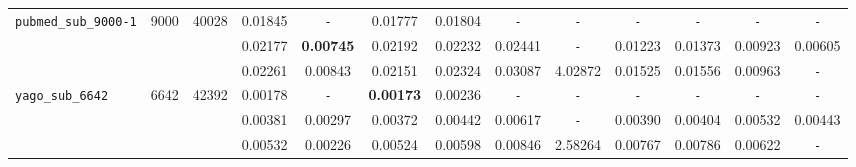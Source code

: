 \begin{table}
{\begin{tabular}{ l c c | c c c c c c c c c c }
\hline
\verb|pubmed_sub_9000-1| & 9000 & 40028 & 0.01845 & \verb|-| & 0.01777 & 0.01804 & \verb|-| & \verb|-| & \verb|-| & \verb|-| & \verb|-| & \verb|-| \\
 &  &  & 0.02177 & \textbf{0.00745} & 0.02192 & 0.02232 & 0.02441 & \verb|-| & 0.01223 & 0.01373 & 0.00923 & 0.00605 \\
 &  &  & 0.02261 & 0.00843 & 0.02151 & 0.02324 & 0.03087 & 4.02872 & 0.01525 & 0.01556 & 0.00963 & \verb|-| \\
\hline
\verb|yago_sub_6642| & 6642 & 42392 & 0.00178 & \verb|-| & \textbf{0.00173} & 0.00236 & \verb|-| & \verb|-| & \verb|-| & \verb|-| & \verb|-| & \verb|-| \\
 &  &  & 0.00381 & 0.00297 & 0.00372 & 0.00442 & 0.00617 & \verb|-| & 0.00390 & 0.00404 & 0.00532 & 0.00443 \\
 &  &  & 0.00532 & 0.00226 & 0.00524 & 0.00598 & 0.00846 & 2.58264 & 0.00767 & 0.00786 & 0.00622 & \verb|-| \\
\hline
  \end{tabular}
}
\end{table}

